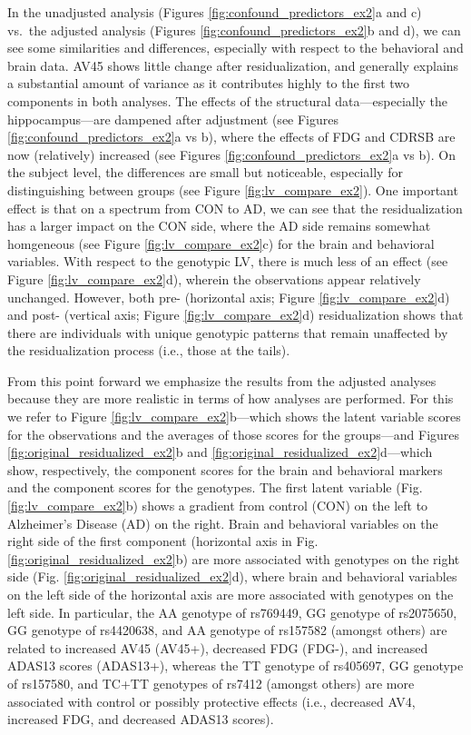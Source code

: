 \documentclass[12pt]{article}
\begin{document}
In the unadjusted analysis (Figures \ref{fig:confound_predictors_ex2}a
and c) vs.~the adjusted analysis (Figures
\ref{fig:confound_predictors_ex2}b and d), we can see some similarities
and differences, especially with respect to the behavioral and brain
data. AV45 shows little change after residualization, and generally
explains a substantial amount of variance as it contributes highly to
the first two components in both analyses. The effects of the structural
data---especially the hippocampus---are dampened after adjustment (see
Figures \ref{fig:confound_predictors_ex2}a vs b), where the effects of
FDG and CDRSB are now (relatively) increased (see Figures
\ref{fig:confound_predictors_ex2}a vs b). On the subject level, the
differences are small but noticeable, especially for distinguishing
between groups (see Figure \ref{fig:lv_compare_ex2}). One important
effect is that on a spectrum from CON to AD, we can see that the
residualization has a larger impact on the CON side, where the AD side
remains somewhat homgeneous (see Figure \ref{fig:lv_compare_ex2}c) for
the brain and behavioral variables. With respect to the genotypic LV,
there is much less of an effect (see Figure \ref{fig:lv_compare_ex2}d),
wherein the observations appear relatively unchanged. However, both pre-
(horizontal axis; Figure \ref{fig:lv_compare_ex2}d) and post- (vertical
axis; Figure \ref{fig:lv_compare_ex2}d) residualization shows that there
are individuals with unique genotypic patterns that remain unaffected by
the residualization process (i.e., those at the tails).

From this point forward we emphasize the results from the adjusted
analyses because they are more realistic in terms of how analyses are
performed. For this we refer to Figure \ref{fig:lv_compare_ex2}b---which
shows the latent variable scores for the observations and the averages
of those scores for the groups---and Figures
\ref{fig:original_residualized_ex2}b and
\ref{fig:original_residualized_ex2}d---which show, respectively, the
component scores for the brain and behavioral markers and the component
scores for the genotypes. The first latent variable (Fig.
\ref{fig:lv_compare_ex2}b) shows a gradient from control (CON) on the
left to Alzheimer's Disease (AD) on the right. Brain and behavioral
variables on the right side of the first component (horizontal axis in
Fig. \ref{fig:original_residualized_ex2}b) are more associated with
genotypes on the right side (Fig. \ref{fig:original_residualized_ex2}d),
where brain and behavioral variables on the left side of the horizontal
axis are more associated with genotypes on the left side. In particular,
the AA genotype of rs769449, GG genotype of rs2075650, GG genotype of
rs4420638, and AA genotype of rs157582 (amongst others) are related to
increased AV45 (AV45+), decreased FDG (FDG-), and increased ADAS13
scores (ADAS13+), whereas the TT genotype of rs405697, GG genotype of
rs157580, and TC+TT genotypes of rs7412 (amongst others) are more
associated with control or possibly protective effects (i.e., decreased
AV4, increased FDG, and decreased ADAS13 scores).
\end{document}
